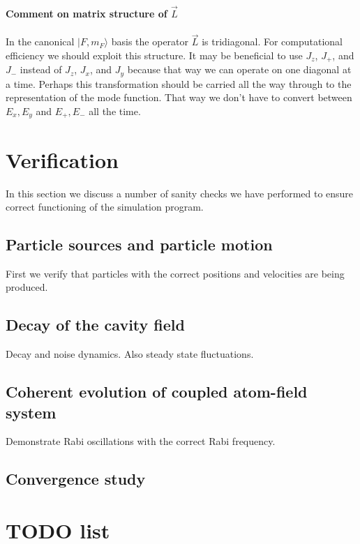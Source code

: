 \documentclass[aps, superscriptaddress, groupedaddress, preprint]{revtex4}
\begin{document}
\paragraph{Comment on matrix structure of $\vec{L}$} In the
canonical $|F,m_F\rangle$ basis the operator $\vec{L}$ is
tridiagonal.  For computational efficiency we should exploit this
structure.  It may be beneficial to use $J_z$, $J_+$, and $J_-$
instead of $J_z$, $J_x$, and $J_y$ because that way we can
operate on one diagonal at a time.  Perhaps this transformation
should be carried all the way through to the representation of
the mode function.  That way we don't have to convert between
$E_x,E_y$ and $E_+, E_-$ all the time.


\section{Verification}

In this section we discuss a number of sanity checks we have
performed to ensure correct functioning of the simulation
program.


\subsection{Particle sources and particle motion}

First we verify that particles with the correct positions and
velocities are being produced.


\subsection{Decay of the cavity field}

Decay and noise dynamics.  Also steady state fluctuations.


\subsection{Coherent evolution of coupled atom-field system}

Demonstrate Rabi oscillations with the correct Rabi frequency.


\subsection{Convergence study}


\section{TODO list}
\end{document}
